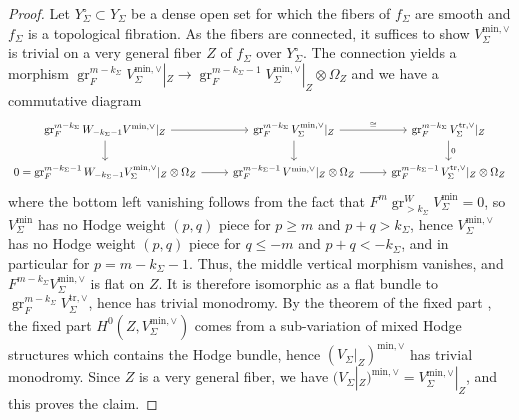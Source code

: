 \documentclass{amsart}
\theoremstyle{definition}
\theoremstyle{remark}
\def\gr{\operatorname{gr}}
\def\trans{\mathrm{tr}}
\def\mini{\mathrm{min}}
\numberwithin{equation}{section}
\begin{document}
\begin{proof} Let $Y^\circ_\Sigma\subset Y_\Sigma$ be a dense open set for which the fibers of $f_\Sigma$ are smooth and $f_\Sigma$ is a topological fibration.  As the fibers are connected, it suffices to show $V^{\mini,\vee}_\Sigma$ is trivial on a very general fiber $Z$ of $f_\Sigma$ over $Y_\Sigma^\circ$.  The connection yields a morphism $\gr_F^{m-k_\Sigma} V^{\mini,\vee}_\Sigma|_Z\to \gr_F^{m-k_\Sigma-1}V^{\mini,\vee}_\Sigma|_Z\otimes \Omega_{Z}$
and we have a commutative diagram
\[\begin{tikzcd}
\gr_F^{m-k_\Sigma} W_{-k_\Sigma-1}V^{\mini,\vee}|_Z\ar[d]\ar[r]&\gr_F^{m-k_\Sigma} V^{\mini,\vee}_\Sigma|_Z\ar[r,"\cong"]\ar[d]&\gr_F^{m-k_\Sigma} V^{\trans,\vee}_\Sigma|_Z\ar[d,"0"] \\
0=\gr_F^{m-k_\Sigma-1}W_{-k_\Sigma-1}V^{\mini,\vee}_\Sigma|_Z\otimes \Omega_{Z} \ar[r]&\gr_F^{m-k_\Sigma-1} V^{\mini,\vee}|_Z\otimes \Omega_{Z} \ar[r]& \gr_F^{m-k_\Sigma-1}V^{\trans,\vee}_\Sigma|_Z\otimes \Omega_{Z}
\end{tikzcd}\]
where the bottom left vanishing follows from the fact that $F^m \gr_{>k_\Sigma}^WV_\Sigma^\mini=0$, so $V_\Sigma^\mini$ has no Hodge weight $(p,q)$ piece for $p\geq m$ and $p+q>k_\Sigma$, hence $V_\Sigma^{\mini,\vee}$ has no Hodge weight $(p,q)$ piece for $q\leq -m$ and $p+q<-k_\Sigma$, and in particular for $p=m-k_\Sigma-1$.  Thus, the middle vertical morphism vanishes, and $F^{m-k_\Sigma} V_\Sigma^{\mini,\vee}$ is flat on $Z$.
It is therefore isomorphic as a flat bundle to $\gr_F^{m-k_\Sigma}V_\Sigma^{\trans,\vee}$, hence has trivial monodromy.
By the theorem of the fixed part \cite{andredeligne}, the fixed part $H^0(Z,V_\Sigma^{\mini,\vee})$ comes from a sub-variation of mixed Hodge structures which contains the Hodge bundle, hence $(V_\Sigma|_{Z})^{\mini,\vee}$ has trivial monodromy.  Since $Z$ is a very general fiber, we have $(V_\Sigma|_{Z})^{\mini,\vee}=V_\Sigma^{\mini,\vee}|_Z$, and this proves the claim.
\end{proof}
\end{document}
